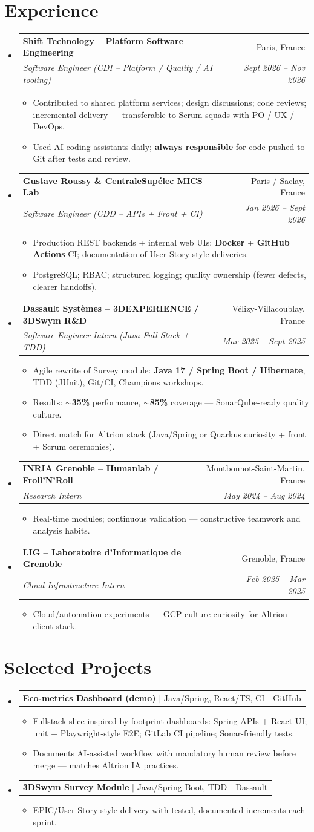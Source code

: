 \documentclass[letterpaper,10.5pt]{article}
\makeatletter
\newcommand{\resumeItem}[1]{\item\small{#1 \vspace{-1.5pt}}}
\newcommand{\resumeSubheading}[4]{\vspace{-1pt}\item\begin{tabular*}{0.97\textwidth}[t]{l@{\extracolsep{\fill}}r}\textbf{#1} & #2 \\\textit{\small#3} & \textit{\small #4} \\\end{tabular*}\vspace{-5pt}}
\newcommand{\resumeProjectHeading}[2]{\item\begin{tabular*}{0.97\textwidth}{l@{\extracolsep{\fill}}r}\small#1 & #2 \\\end{tabular*}\vspace{-5pt}}
\newcommand{\resumeSubHeadingListStart}{\begin{itemize}[leftmargin=0.15in, label={}]}
\newcommand{\resumeSubHeadingListEnd}{\end{itemize}}
\newcommand{\resumeItemListStart}{\begin{itemize}[leftmargin=0.18in]}
\newcommand{\resumeItemListEnd}{\end{itemize}\vspace{-3pt}}
\makeatother
\begin{document}
\section{Experience}
\resumeSubHeadingListStart
  \resumeSubheading
    {Shift Technology -- Platform Software Engineering}{Paris, France}
    {Software Engineer (CDI -- Platform / Quality / AI tooling)}{Sept 2026 -- Nov 2026}
    \resumeItemListStart
      \resumeItem{Contributed to shared platform services; design discussions; code reviews; incremental delivery --- transferable to Scrum squads with PO / UX / DevOps.}
      \resumeItem{Used AI coding assistants daily; \textbf{always responsible} for code pushed to Git after tests and review.}
    \resumeItemListEnd
  \resumeSubheading
    {Gustave Roussy \& CentraleSup\'elec MICS Lab}{Paris / Saclay, France}
    {Software Engineer (CDD -- APIs + Front + CI)}{Jan 2026 -- Sept 2026}
    \resumeItemListStart
      \resumeItem{Production REST backends + internal web UIs; \textbf{Docker} + \textbf{GitHub Actions} CI; documentation of User-Story-style deliveries.}
      \resumeItem{PostgreSQL; RBAC; structured logging; quality ownership (fewer defects, clearer handoffs).}
    \resumeItemListEnd
  \resumeSubheading
    {Dassault Syst\`emes -- 3DEXPERIENCE / 3DSwym R\&D}{V\'elizy-Villacoublay, France}
    {Software Engineer Intern (Java Full-Stack + TDD)}{Mar 2025 -- Sept 2025}
    \resumeItemListStart
      \resumeItem{Agile rewrite of Survey module: \textbf{Java 17 / Spring Boot / Hibernate}, TDD (JUnit), Git/CI, Champions workshops.}
      \resumeItem{Results: \textbf{$\sim$35\%} performance, \textbf{$\sim$85\%} coverage --- SonarQube-ready quality culture.}
      \resumeItem{Direct match for Altrion stack (Java/Spring or Quarkus curiosity + front + Scrum ceremonies).}
    \resumeItemListEnd
  \resumeSubheading
    {INRIA Grenoble -- Humanlab / Froll'N'Roll}{Montbonnot-Saint-Martin, France}
    {Research Intern}{May 2024 -- Aug 2024}
    \resumeItemListStart
      \resumeItem{Real-time modules; continuous validation --- constructive teamwork and analysis habits.}
    \resumeItemListEnd
  \resumeSubheading
    {LIG -- Laboratoire d'Informatique de Grenoble}{Grenoble, France}
    {Cloud Infrastructure Intern}{Feb 2025 -- Mar 2025}
    \resumeItemListStart
      \resumeItem{Cloud/automation experiments --- GCP culture curiosity for Altrion client stack.}
    \resumeItemListEnd
\resumeSubHeadingListEnd
\section{Selected Projects}
\resumeSubHeadingListStart
  \resumeProjectHeading{\textbf{Eco-metrics Dashboard (demo)} $|$ Java/Spring, React/TS, CI}{GitHub}
    \resumeItemListStart
      \resumeItem{Fullstack slice inspired by footprint dashboards: Spring APIs + React UI; unit + Playwright-style E2E; GitLab CI pipeline; Sonar-friendly tests.}
      \resumeItem{Documents AI-assisted workflow with mandatory human review before merge --- matches Altrion IA practices.}
    \resumeItemListEnd
  \resumeProjectHeading{\textbf{3DSwym Survey Module} $|$ Java/Spring Boot, TDD}{Dassault}
    \resumeItemListStart
      \resumeItem{EPIC/User-Story style delivery with tested, documented increments each sprint.}
    \resumeItemListEnd
\resumeSubHeadingListEnd
\end{document}
